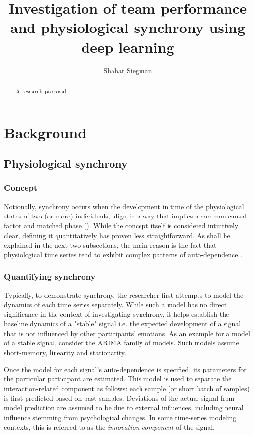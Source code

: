\documentclass[a4paper, 11pt]{article}      %
\title{\LARGE \bf
Investigation of team performance 
and physiological synchrony
using deep learning }
\author{Shahar Siegman}
\begin{document}
\maketitle
\thispagestyle{empty}
\pagestyle{empty}


\begin{abstract}

A research proposal.

\end{abstract}

\section{Background}
\subsection{Physiological synchrony}
\subsubsection{Concept}
Notionally, synchrony occurs when the development in time of the physiological states of two (or more) individuals, align in a way that implies a common causal factor and matched phase (\cite{palumbo2017interpersonal}). 
While the concept itself is considered intuitively clear, defining it quantitatively has proven less straightforward. As shall be explained in the next two subsections, the main reason is the fact that physiological time series tend to exhibit complex patterns of auto-dependence \cite{ivanov20011}. 

\subsubsection{Quantifying synchrony}
Typically, to demonstrate synchrony, the researcher first attempts to model the dynamics of each time series separately. While such a model has no direct significance in the context of investigating synchrony, it helps establish the  baseline dynamics of a "stable" signal i.e. the expected development of a signal that is not influenced by other participants' emotions. As an example for a model of a stable signal, consider the ARIMA family of models. Such models assume short-memory, linearity and stationarity. 

Once the model for each signal's auto-dependence is specified, its parameters for the particular participant are estimated. This model is used to separate the interaction-related component as follows: each sample (or short batch of samples) is first predicted based on past samples. Deviations of the actual signal from model prediction are assumed to be due to external influences, including neural influence stemming from psychological changes. In some time-series modeling contexts, this is referred to as the \emph{innovation component} of the signal. 
\end{document}
